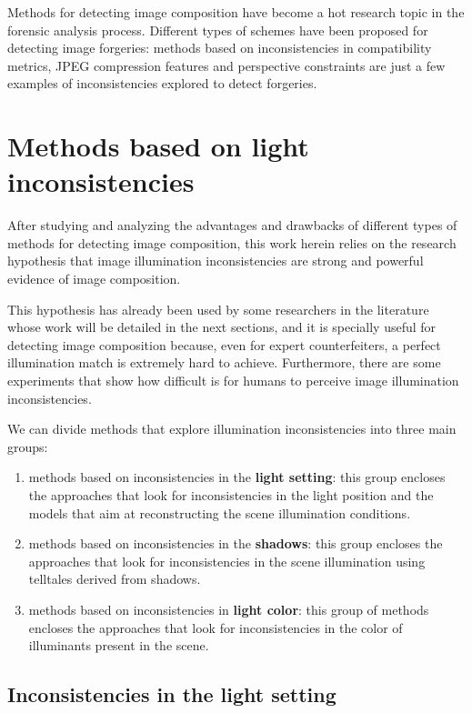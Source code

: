 Methods for detecting image composition have become a hot research topic  in the forensic analysis process. Different types of schemes have been proposed for detecting image forgeries: methods based on inconsistencies in compatibility metrics, JPEG compression features and perspective constraints are just a few examples of inconsistencies explored to detect forgeries.

\section{Methods based on light inconsistencies}

After studying and analyzing the advantages and drawbacks of different types of methods for detecting image composition, this work herein relies on the research hypothesis that image illumination inconsistencies are strong and powerful evidence of image composition.

This hypothesis has already been used by some researchers in the literature whose work will be detailed in the next sections, and it is specially useful for detecting image composition because, even for expert counterfeiters, a perfect illumination match is extremely hard to achieve. Furthermore, there are some experiments that show how difficult is for humans to perceive image illumination inconsistencies. \cite{ostrovsky2005perceiving}

We can divide methods that explore illumination inconsistencies into three main groups:
\begin{enumerate}
\item methods based on inconsistencies in the \textbf{light setting}: this group encloses the approaches that look for inconsistencies in the light position and the models that aim at reconstructing the scene illumination conditions.
\item methods based on inconsistencies in the \textbf{shadows}: this group encloses the approaches that look for inconsistencies in the scene illumination using telltales derived from shadows.
\item methods based on inconsistencies in \textbf{light color}: this group of methods encloses the approaches that look for inconsistencies in the color of illuminants present in the scene.
\end{enumerate}


\subsection{Inconsistencies in the light setting}

